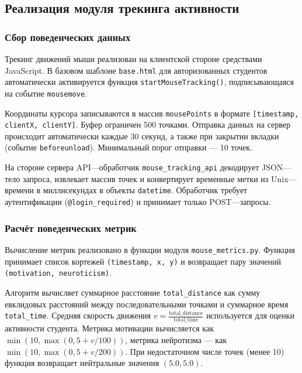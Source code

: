 \subsection{Реализация модуля трекинга активности}
\label{subsec:tracking_module}

\subsubsection{Сбор поведенческих данных}

Трекинг движений мыши реализован на клиентской стороне 
средствами JavaScript. В базовом шаблоне \texttt{base.html} 
для авторизованных студентов автоматически активируется функция 
\texttt{startMouseTracking()}, подписывающаяся на событие 
\texttt{mousemove}.

Координаты курсора записываются в массив \texttt{mousePoints} 
в формате \texttt{[timestamp, clientX, clientY]}. Буфер ограничен 
500 точками. Отправка данных на сервер происходит автоматически 
каждые 30 секунд, а также при закрытии вкладки (событие 
\texttt{beforeunload}). Минимальный порог отправки --- 10 точек.

На стороне сервера API---обработчик \texttt{mouse\_tracking\_api} 
декодирует JSON---тело запроса, извлекает массив точек и конвертирует 
временные метки из Unix---времени в миллисекундах в объекты 
\texttt{datetime}. Обработчик требует аутентификации 
(\texttt{@login\_required}) и принимает только POST---запросы.

\subsubsection{Расчёт поведенческих метрик}

Вычисление метрик реализовано в функции модуля 
\texttt{mouse\_metrics.py}. Функция принимает список 
кортежей \texttt{(timestamp, x, y)} и возвращает пару значений 
\texttt{(motivation, neuroticism)}.

Алгоритм вычисляет суммарное расстояние \texttt{total\_distance} как 
сумму евклидовых расстояний между последовательными точками и суммарное 
время \texttt{total\_time}. Средняя скорость движения 
$v = \frac{\text{total\_distance}}{\text{total\_time}}$ используется 
для оценки активности студента. Метрика мотивации вычисляется как 
$\min(10, \max(0, 5 + v / 100))$, метрика нейротизма --- как 
$\min(10, \max(0, 5 + v / 200))$. При недостаточном числе точек 
(менее 10) функция возвращает нейтральные значения $(5.0, 5.0)$.

